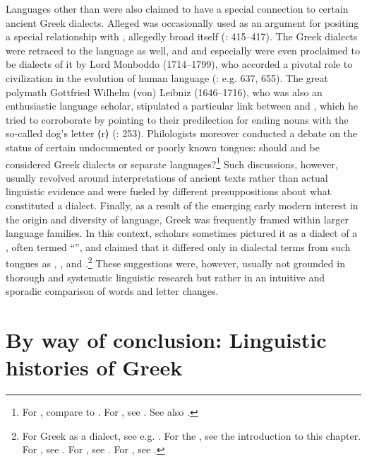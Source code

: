 Languages other than  were also claimed to have a special connection to certain ancient Greek dialects. Alleged   was occasionally used as an argument for positing a special relationship with , allegedly broad itself (\citealt{Saumaise1643a}: 415–417). The Greek dialects were retraced to the  language as well, and  and especially  were even proclaimed to be dialects of it by Lord Monboddo (1714–1799), who accorded a pivotal role to  civilization in the evolution of human language (\citealt{Monboddo1774}: e.g. 637, 655). The great polymath Gottfried Wilhelm (von) Leibniz (1646–1716), who was also an enthusiastic language scholar, stipulated a particular link between  and , which he tried to corroborate by pointing to their predilection for ending nouns with the so-called dog’s letter ⟨r⟩ (\citealt{Leibniz1991}: 253). Philologists moreover conducted a debate on the status of certain undocumented or poorly known tongues: should  and  be considered Greek dialects or separate languages?\footnote{For , compare \citet[465]{Rijcke1684} to \citet[16]{Jablonski1714}. For , see \citet[2]{Jablonski1714}. See also \citet[]{VanRooyFcd}.} Such discussions, however, usually revolved around interpretations of ancient texts rather than actual linguistic evidence and were fueled by different presuppositions about what constituted a dialect. Finally, as a result of the emerging early modern interest in the origin and diversity of language, Greek was frequently framed within larger language families. In this context, scholars sometimes pictured it as a dialect of a , often termed “”, and claimed that it differed only in dialectal terms from such tongues as , , and .\footnote{For Greek as a  dialect, see e.g. \citet[xxxiv]{Court1778}. For the , see the introduction to this chapter. For , see \citet[139; 190]{Casaubon1650}. For , see \citet[*.3\textsc{\textsuperscript{v}}]{Junius1665}. For , see \citet[\textsc{i}.44]{Martin1727}.} These suggestions were, however, usually not grounded in thorough and systematic linguistic research but rather in an intuitive and sporadic comparison of words and letter changes.

\section{By way of conclusion: Linguistic histories of Greek}\label{sec:5.8}

